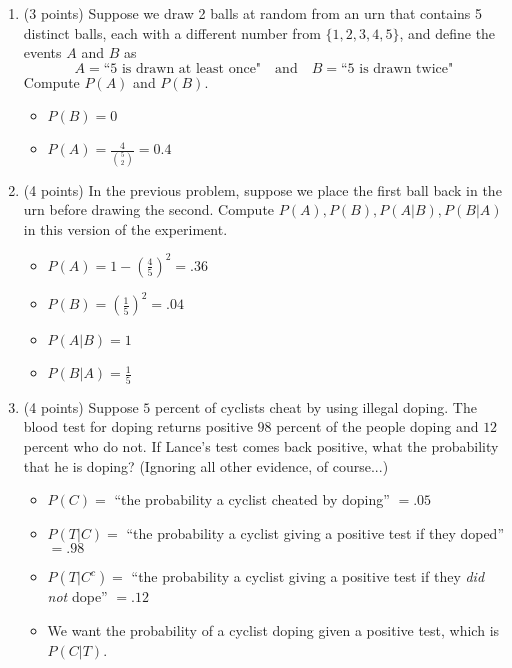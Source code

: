 \documentclass[11pt]{article}
\begin{document}
\begin{enumerate}
\item (3 points) Suppose we draw 2 balls at random from an urn that contains 5 distinct
balls, each with a different number from $\{1,2,3,4,5\}$, and define the events
$A$ and $B$ as
\[
A = \text{``5 is drawn at least once"} \quad \text{and} \quad
B = \text{``5 is drawn twice"} 
\]
Compute $P(A)$ and $P(B)$.

\begin{itemize}

\item $P(B) = 0$
\item $P(A) = \frac{4}{{5\choose 2}} = 0.4$

\end{itemize}

\item (4 points) In the previous problem, suppose we place the first ball back
in the urn before drawing the second.  Compute $P(A),P(B),P(A|B),P(B|A)$ in
this version of the experiment.

\begin{itemize}

\item $P(A) = 1 - \left(\frac{4}{5}\right)^2 = .36 $
\item $P(B) = \left(\frac{1}{5}\right)^2 = .04$
\item $P(A|B) = 1$
\item $P(B|A) = \frac{1}{5}$

\end{itemize}

\item (4 points) Suppose $5$ percent of cyclists cheat by using illegal doping.
The blood test for doping returns positive $98$ percent of the people
doping and $12$ percent who do not.  If Lance's test comes back positive,
what the probability that he is doping? (Ignoring all other evidence,
of course...)

\begin{itemize}

	\item $P(C) = $ ``the probability a cyclist cheated by doping'' $= .05$
	\item $P(T|C) = $ ``the probability a cyclist giving a positive test if they doped'' $= .98$
	\item $P(T|C^c) = $ ``the probability a cyclist giving a positive test if they \emph{did not} dope'' $ = .12$
	\item We want the probability of a cyclist doping given a positive test, which is $P(C|T)$.


\end{itemize}
\end{enumerate}
\end{document}
